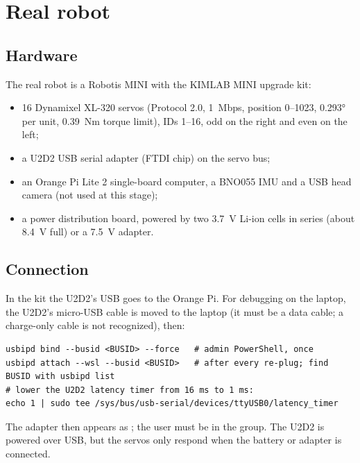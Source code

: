 \documentclass[11pt,a4paper]{article}
\newcommand{\code}[1]{\texttt{\detokenize{#1}}}
\begin{document}
\section{Real robot}

\subsection{Hardware}
The real robot is a Robotis MINI with the KIMLAB MINI upgrade kit:
\begin{itemize}
  \item 16 Dynamixel XL-320 servos (Protocol 2.0, 1~Mbps, position 0--1023, 0.293° per unit, 0.39~Nm torque limit), IDs 1--16, odd on the right and even on the left;
  \item a U2D2 USB serial adapter (FTDI chip) on the servo bus;
  \item an Orange Pi Lite 2 single-board computer, a BNO055 IMU and a USB head camera (not used at this stage);
  \item a power distribution board, powered by two 3.7~V Li-ion cells in series (about 8.4~V full) or a 7.5~V adapter.
\end{itemize}

\subsection{Connection}
In the kit the U2D2's USB goes to the Orange Pi. For debugging on the laptop, the U2D2's micro-USB cable is moved to the laptop (it must be a data cable; a charge-only cable is not recognized), then:
\begin{Verbatim}
usbipd bind --busid <BUSID> --force   # admin PowerShell, once
usbipd attach --wsl --busid <BUSID>   # after every re-plug; find BUSID with usbipd list
# lower the U2D2 latency timer from 16 ms to 1 ms:
echo 1 | sudo tee /sys/bus/usb-serial/devices/ttyUSB0/latency_timer
\end{Verbatim}
The adapter then appears as \code{/dev/ttyUSB0}; the user must be in the \code{dialout} group. The U2D2 is powered over USB, but the servos only respond when the battery or adapter is connected.
\end{document}

